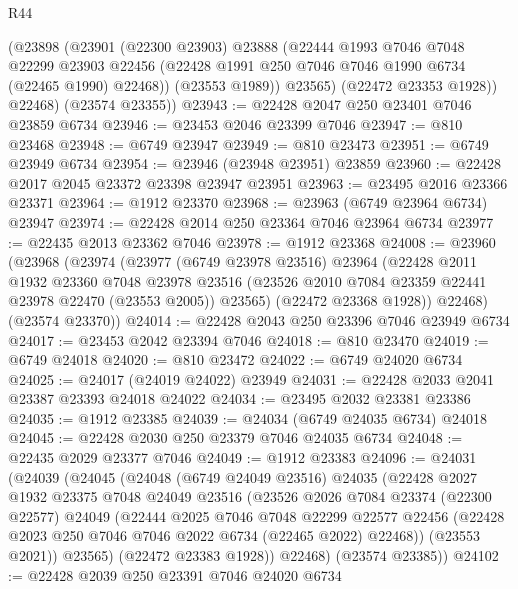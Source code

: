 \begin{lexlean}{R44}
\begin{coremodule}
{          (@23898
            (@23901
              (@22300 @23903)
              @23888
              (@22444
                @1993
                @7046
                @7048
                @22299
                @23903
                @22456
                (@22428 @1991 @250 @7046 @7046 @1990 @6734 (@22465 @1990) @22468))
              (@23553 @1989))
            @23565)
          (@22472 @23353 @1928))
        @22468)
      (@23574 @23355))
@23943 := @22428 @2047 @250 @23401 @7046 @23859 @6734
@23946 := @23453 @2046 @23399 @7046
@23947 := @810 @23468
@23948 := @6749 @23947
@23949 := @810 @23473
@23951 := @6749 @23949 @6734
@23954 := @23946 (@23948 @23951) @23859
@23960 := @22428 @2017 @2045 @23372 @23398 @23947 @23951
@23963 := @23495 @2016 @23366 @23371
@23964 := @1912 @23370
@23968 := @23963 (@6749 @23964 @6734) @23947
@23974 := @22428 @2014 @250 @23364 @7046 @23964 @6734
@23977 := @22435 @2013 @23362 @7046
@23978 := @1912 @23368
@24008 := @23960
    (@23968
      (@23974
        (@23977
          (@6749 @23978 @23516)
          @23964
          (@22428
            @2011
            @1932
            @23360
            @7048
            @23978
            @23516
            (@23526 @2010 @7084 @23359 @22441 @23978 @22470 (@23553 @2005))
            @23565)
          (@22472 @23368 @1928))
        @22468)
      (@23574 @23370))
@24014 := @22428 @2043 @250 @23396 @7046 @23949 @6734
@24017 := @23453 @2042 @23394 @7046
@24018 := @810 @23470
@24019 := @6749 @24018
@24020 := @810 @23472
@24022 := @6749 @24020 @6734
@24025 := @24017 (@24019 @24022) @23949
@24031 := @22428 @2033 @2041 @23387 @23393 @24018 @24022
@24034 := @23495 @2032 @23381 @23386
@24035 := @1912 @23385
@24039 := @24034 (@6749 @24035 @6734) @24018
@24045 := @22428 @2030 @250 @23379 @7046 @24035 @6734
@24048 := @22435 @2029 @23377 @7046
@24049 := @1912 @23383
@24096 := @24031
    (@24039
      (@24045
        (@24048
          (@6749 @24049 @23516)
          @24035
          (@22428
            @2027
            @1932
            @23375
            @7048
            @24049
            @23516
            (@23526
              @2026
              @7084
              @23374
              (@22300 @22577)
              @24049
              (@22444
                @2025
                @7046
                @7048
                @22299
                @22577
                @22456
                (@22428 @2023 @250 @7046 @7046 @2022 @6734 (@22465 @2022) @22468))
              (@23553 @2021))
            @23565)
          (@22472 @23383 @1928))
        @22468)
      (@23574 @23385))
@24102 := @22428 @2039 @250 @23391 @7046 @24020 @6734
}
\end{coremodule}
\end{lexlean}
